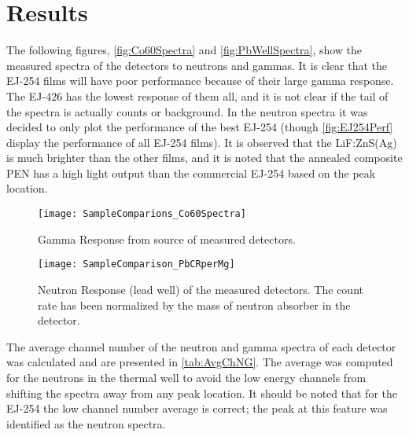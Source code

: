 \documentclass[draftcls,onecolumn]{IEEEtran}
\begin{document}
\section{Results}
The following figures, \autoref{fig:Co60Spectra} and \autoref{fig:PbWellSpectra}, show the measured spectra of the detectors to neutrons and gammas.
It is clear that the EJ-254 films will have poor performance because of their large gamma response.
The EJ-426 has the lowest response of them all, and it is not clear if the tail of the spectra is actually counts or background.
In the neutron spectra it was decided to only plot the performance of the best EJ-254 (though \autoref{fig:EJ254Perf} display the performance of all EJ-254 films).
It is observed that the LiF:ZnS(Ag) is much brighter than the other films, and it is noted that the annealed composite PEN has a high light output than the commercial EJ-254 based on the peak location.
\begin{figure}
  \centering
  \texttt{[image: SampleComparions\_Co60Spectra]}
  \caption[Gamma Response of Measured Detectors]{Gamma Response from  source of measured detectors.}
  \label{fig:Co60Spectra}
\end{figure}
\begin{figure}
  \centering
  \texttt{[image: SampleComparison\_PbCRperMg]}
  \caption[Neutron Response of Measured Detectors]{Neutron Response (lead well) of the measured detectors. The count rate has been normalized by the mass of neutron absorber in the detector.}
  \label{fig:PbWellSpectra}
\end{figure}
The average channel number of the neutron and gamma spectra of each detector was calculated and are presented in \autoref{tab:AvgChNG}.
The average was computed for the neutrons in the thermal well to avoid the low energy channels from shifting the spectra away from any peak location.
It should be noted that for the EJ-254 the low channel number average is correct; the peak at this feature was identified as the neutron spectra.
\end{document}
